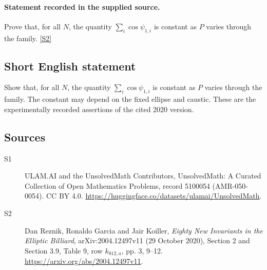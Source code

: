 \documentclass[11pt]{article}
\newcommand{\sref}[2]{\hyperlink{source:#1:#2}{[S#2]}}
\begin{document}
\paragraph{Statement recorded in the supplied source.}
Prove that, for all $N$, the quantity $\sum_i\cos\psi_{1,i}$ is constant as $P$ varies through the family. \sref{5100054}{2}
\subsection{Short English statement}
Show that, for all $N$, the quantity $\sum_i\cos\psi_{1,i}$ is constant as $P$ varies through the family. The constant may depend on the fixed ellipse and caustic. These are the experimentally recorded assertions of the cited 2020 version.
\subsection{Sources}
\begin{description}
\item[\hypertarget{source:5100054:1}{S1}] ULAM.AI and the UnsolvedMath Contributors, UnsolvedMath: A Curated Collection of Open Mathematics Problems, record 5100054 (AMR-050-0054). CC BY 4.0. \url{https://huggingface.co/datasets/ulamai/UnsolvedMath}.
\item[\hypertarget{source:5100054:2}{S2}] Dan Reznik, Ronaldo Garcia and Jair Koiller, \emph{Eighty New Invariants in the Elliptic Billiard}, arXiv:2004.12497v11 (29 October 2020), Section 2 and Section 3.9, Table 9, row $k_{812,a}$, pp. 3, 9--12. \url{https://arxiv.org/abs/2004.12497v11}.
\end{description}
\label{end:5100054}
\end{document}
